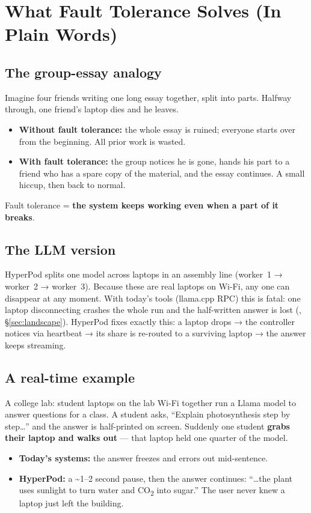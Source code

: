 \section{What Fault Tolerance Solves (In Plain Words)}
\label{sec:solves}

\subsection{The group-essay analogy}
Imagine four friends writing one long essay together, split into parts. Halfway
through, one friend's laptop dies and he leaves.
\begin{itemize}[leftmargin=1.4em,nosep]
  \item \textbf{Without fault tolerance:} the whole essay is ruined; everyone
  starts over from the beginning. All prior work is wasted.
  \item \textbf{With fault tolerance:} the group notices he is gone, hands his
  part to a friend who has a spare copy of the material, and the essay continues.
  A small hiccup, then back to normal.
\end{itemize}
Fault tolerance = \textbf{the system keeps working even when a part of it breaks}.

\subsection{The LLM version}
HyperPod splits one model across laptops in an assembly line (worker~1 →
worker~2 → worker~3). Because these are real laptops on Wi-Fi, any one can
disappear at any moment. With today's tools (llama.cpp RPC) this is fatal: one
laptop disconnecting crashes the whole run and the half-written answer is lost
(\VER, \S\ref{sec:landscape}). HyperPod fixes exactly this: a laptop drops →
the controller notices via heartbeat → its share is re-routed to a surviving
laptop → the answer keeps streaming.

\subsection{A real-time example}
 A college lab: student laptops on the lab Wi-Fi together run a
Llama model to answer questions for a class. A student asks, ``Explain
photosynthesis step by step\ldots'' and the answer is half-printed on screen.
Suddenly one student \textbf{grabs their laptop and walks out} --- that laptop
held one quarter of the model.
\begin{itemize}[leftmargin=1.4em,nosep]
  \item \textbf{Today's systems:} the answer freezes and errors out mid-sentence.
  \item \textbf{HyperPod:} a \textasciitilde1--2 second pause, then the answer
  continues: ``\ldots the plant uses sunlight to turn water and CO\textsubscript{2}
  into sugar.'' The user never knew a laptop just left the building.
\end{itemize}

